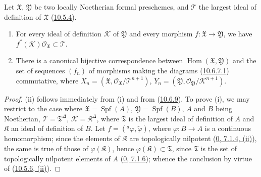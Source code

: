 \begin{corollary}[10.6.10]
\label{I.10.6.10}
Let $\mathfrak{X}$, $\mathfrak{Y}$ be two locally Noetherian formal
preschemes, and $\mathscr{T}$ the largest ideal of definition
of $\mathfrak{X}$ (\hyperref[I.10.5.4]{10.5.4}).
\begin{enumerate}
  \item[\rm{(i)}] For every ideal of definition $\mathscr{K}$ of
  $\mathfrak{Y}$ and every morphism
  $f:\mathfrak{X}\to\mathfrak{Y}$, we have
  $f^*(\mathscr{K})\mathscr{O}_{\mathfrak{X}}\subset\mathscr{T}$.
  \item[\rm{(ii)}] There is a canonical bijective correspondence between
  $\operatorname{Hom}(\mathfrak{X},\mathfrak{Y})$ and the set of
  sequences $(f_n)$ of morphisms making the diagrams
  (\hyperref[I.10.6.7.1]{10.6.7.1}) commutative, where
  $X_n=(\mathfrak{X},
  \mathscr{O}_{\mathfrak{X}}/\mathscr{T}^{n+1})$,
  $Y_n=(\mathfrak{Y},
  \mathscr{O}_{\mathfrak{Y}}/\mathscr{K}^{n+1})$.
\end{enumerate}
\end{corollary}

\begin{proof}
(ii) follows immediately from (i) and from
(\hyperref[I.10.6.9]{10.6.9}). To prove (i), we may restrict
to the case where $\mathfrak{X}=\operatorname{Spf}(A)$,
$\mathfrak{Y}=\operatorname{Spf}(B)$, $A$ and $B$ being Noetherian,
$\mathscr{T}=\mathfrak{T}^\Delta$,
$\mathscr{K}=\mathfrak{K}^\Delta$, where $\mathfrak{T}$ is the largest
ideal of definition of $A$ and $\mathfrak{K}$ an ideal of definition of
$B$. Let $f=({}^a\varphi,\widetilde{\varphi})$, where
$\varphi:B\to A$ is a continuous homomorphism; since the elements of
$\mathfrak{K}$ are topologically nilpotent
(\hyperref[0.7.1.4]{0, 7.1.4, (ii)}), the same is true of those of
$\varphi(\mathfrak{K})$, hence
$\varphi(\mathfrak{K})\subset\mathfrak{T}$, since $\mathfrak{T}$ is
the set of topologically nilpotent elements of $A$
(\hyperref[0.7.1.6]{0, 7.1.6}); whence the conclusion by virtue of
(\hyperref[I.10.5.6]{10.5.6, (ii)}).
\end{proof}

